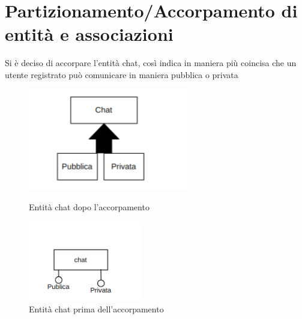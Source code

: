 \section{Partizionamento/Accorpamento di entità e associazioni}
Si è deciso di accorpare l'entità chat, così indica in maniera più coincisa che un utente registrato può comunicare in maniera pubblica o privata
\begin{figure}[ht]
    \centering
    \begin{minipage}{.45\textwidth}
        \centering
        \includegraphics[width=0.9\linewidth]{resources/chat_revised.png}
        \caption{Entità chat dopo l'accorpamento}
        \label{Entità chat dopo l'accorpamento}
    \end{minipage}%
    \begin{minipage}{.5\textwidth}
        \centering
        \includegraphics[width=0.9\linewidth]{resources/chat.png}
        \caption{Entità chat prima dell'accorpamento}
        \label{Entità chat prima dell'accorpamento}
    \end{minipage}
\end{figure}

